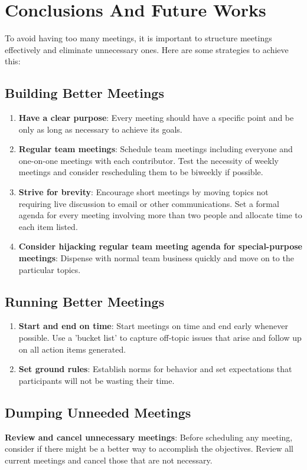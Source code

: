 \section{Conclusions And Future Works}
To avoid having too many meetings, it is important to structure meetings effectively and eliminate unnecessary ones. Here are some strategies to achieve this:
\subsection{Building Better Meetings}
\begin{enumerate}[noitemsep]
\item {\bf Have a clear purpose}: Every meeting should have a specific point and be only as long as necessary to achieve its goals.\\
\item {\bf Regular team meetings}: Schedule team meetings including everyone and one-on-one meetings with each contributor. Test the necessity of weekly meetings and consider rescheduling them to be biweekly if possible.\\
\item {\bf Strive for brevity}: Encourage short meetings by moving topics not requiring live discussion to email or other communications. Set a formal agenda for every meeting involving more than two people and allocate time to each item listed.\\
\item {\bf Consider hijacking regular team meeting agenda for special-purpose meetings}: Dispense with normal team business quickly and move on to the particular topics.\\
\end{enumerate}
\subsection{Running Better Meetings}
\begin{enumerate}[noitemsep]
\item {\bf Start and end on time}: Start meetings on time and end early whenever possible. Use a 'bucket list' to capture off-topic issues that arise and follow up on all action items generated.\\
\item {\bf Set ground rules}: Establish norms for behavior and set expectations that participants will not be wasting their time.\\
\end{enumerate}
\subsection{Dumping Unneeded Meetings}
{\bf Review and cancel unnecessary meetings}: Before scheduling any meeting, consider if there might be a better way to accomplish the objectives. Review all current meetings and cancel those that are not necessary.\\


